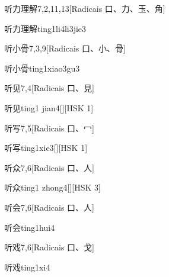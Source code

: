 \begin{entry}{听力理解}{7,2,11,13}[Radicais ⼝、⼒、⽟、⾓]
  \begin{phonetics}{听力理解}{ting1li4li3jie3}
  \end{phonetics}
\end{entry}

\begin{entry}{听小骨}{7,3,9}[Radicais ⼝、⼩、⾻]
  \begin{phonetics}{听小骨}{ting1xiao3gu3}
  \end{phonetics}
\end{entry}

\begin{entry}{听见}{7,4}[Radicais ⼝、⾒]
  \begin{phonetics}{听见}{ting1 jian4}[][HSK 1]
  \end{phonetics}
\end{entry}

\begin{entry}{听写}{7,5}[Radicais ⼝、⼍]
  \begin{phonetics}{听写}{ting1xie3}[][HSK 1]
  \end{phonetics}
\end{entry}

\begin{entry}{听众}{7,6}[Radicais ⼝、⼈]
  \begin{phonetics}{听众}{ting1 zhong4}[][HSK 3]
  \end{phonetics}
\end{entry}

\begin{entry}{听会}{7,6}[Radicais ⼝、⼈]
  \begin{phonetics}{听会}{ting1hui4}
  \end{phonetics}
\end{entry}

\begin{entry}{听戏}{7,6}[Radicais ⼝、⼽]
  \begin{phonetics}{听戏}{ting1xi4}
  \end{phonetics}
\end{entry}

